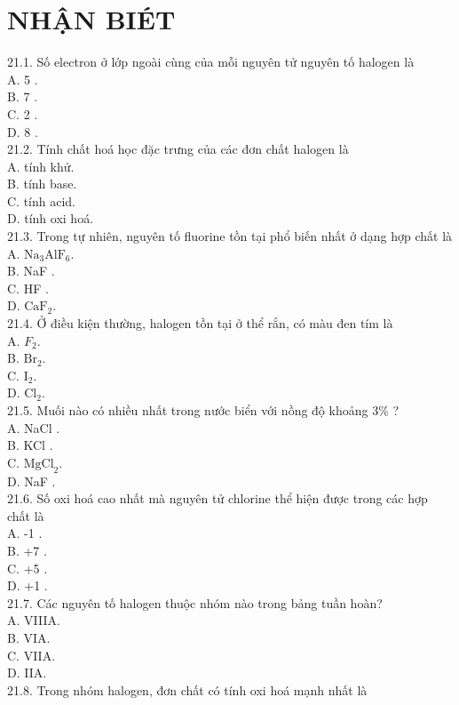 \documentclass[10pt]{article}
\begin{document}
\section*{NHẬN BIÉT}
21.1. Số electron ở lớp ngoài cùng của mỗi nguyên tử nguyên tố halogen là\\
A. 5 .\\
B. 7 .\\
C. 2 .\\
D. 8 .\\
21.2. Tính chất hoá học đặc trưng của các đơn chất halogen là\\
A. tính khử.\\
B. tính base.\\
C. tính acid.\\
D. tính oxi hoá.\\
21.3. Trong tự nhiên, nguyên tố fluorine tồn tại phổ biến nhất ở dạng hợp chất là\\
A. $\mathrm{Na}_{3} \mathrm{AlF}_{6}$.\\
B. NaF .\\
C. HF .\\
D. $\mathrm{CaF}_{2}$.\\
21.4. Ở điều kiện thường, halogen tồn tại ở thể rắn, có màu đen tím là\\
A. $F_{2}$.\\
B. $\mathrm{Br}_{2}$.\\
C. $\mathrm{I}_{2}$.\\
D. $\mathrm{Cl}_{2}$.\\
21.5. Muối nào có nhiều nhất trong nước biển với nồng độ khoảng $3 \%$ ?\\
A. NaCl .\\
B. KCl .\\
C. $\mathrm{MgCl}_{2}$.\\
D. NaF .\\
21.6. Số oxi hoá cao nhất mà nguyên tử chlorine thể hiện được trong các hợp chất là\\
A. -1 .\\
B. +7 .\\
C. +5 .\\
D. +1 .\\
21.7. Các nguyên tố halogen thuộc nhóm nào trong bảng tuần hoàn?\\
A. VIIIA.\\
B. VIA.\\
C. VIIA.\\
D. IIA.\\
21.8. Trong nhóm halogen, đơn chất có tính oxi hoá mạnh nhất là\\
\end{document}

